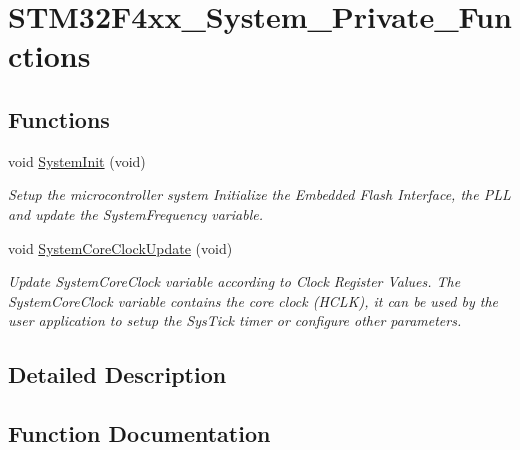 \hypertarget{group___s_t_m32_f4xx___system___private___functions}{}\section{S\+T\+M32\+F4xx\+\_\+\+System\+\_\+\+Private\+\_\+\+Functions}
\label{group___s_t_m32_f4xx___system___private___functions}
\subsection*{Functions}
\begin{DoxyCompactItemize}
\item 
void \hyperlink{group___s_t_m32_f4xx___system___private___functions_ga93f514700ccf00d08dbdcff7f1224eb2}{System\+Init} (void)
\begin{DoxyCompactList}\small\item\em Setup the microcontroller system Initialize the Embedded Flash Interface, the P\+L\+L and update the System\+Frequency variable. \end{DoxyCompactList}\item 
void \hyperlink{group___s_t_m32_f4xx___system___private___functions_gae0c36a9591fe6e9c45ecb21a794f0f0f}{System\+Core\+Clock\+Update} (void)
\begin{DoxyCompactList}\small\item\em Update System\+Core\+Clock variable according to Clock Register Values. The System\+Core\+Clock variable contains the core clock (H\+C\+L\+K), it can be used by the user application to setup the Sys\+Tick timer or configure other parameters. \end{DoxyCompactList}\end{DoxyCompactItemize}


\subsection{Detailed Description}


\subsection{Function Documentation}
\hypertarget{group___s_t_m32_f4xx___system___private___functions_gae0c36a9591fe6e9c45ecb21a794f0f0f}{}
